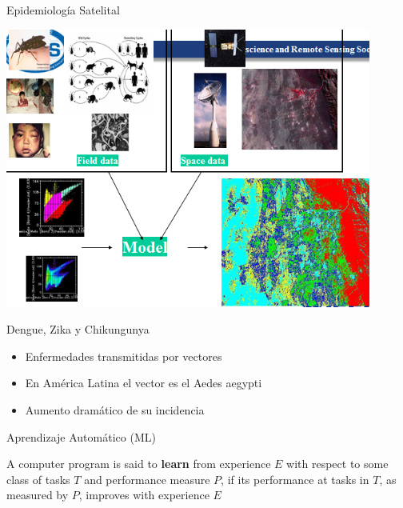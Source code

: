 \documentclass[10pt]{beamer}
\begin{document}
\begin{frame}{Epidemiología Satelital}
  \begin{center}
    \includegraphics[width=0.9\textwidth]{global.png}
  \end{center}
\end{frame}

\begin{frame}{Dengue, Zika y Chikungunya}

  \begin{itemize}[<+->]
  \item Enfermedades transmitidas por vectores
  \item En América Latina el vector es el Aedes aegypti
  \item Aumento dramático de su incidencia
  \end{itemize}

\end{frame}

\begin{frame}{Aprendizaje Automático (ML)}

  A computer program is said to \textbf{learn} from experience $E$ with
  respect to some class of tasks $T$ and performance measure $P$, if its
  performance at tasks in $T$, as measured by $P$, improves with experience $E$

\end{frame}
\end{document}
